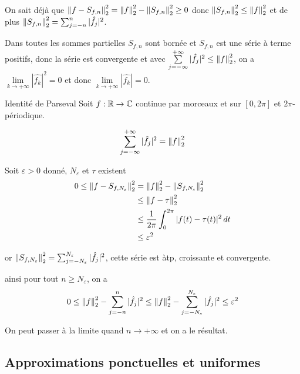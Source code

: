 \documentclass[a4paper, 12pt]{article}
\begin{document}
\begin{demonstration}

    On sait déjà que $\left\lVert f - S_{f,n}\right\rVert_2^2 = \left\lVert f\right\rVert_2^2 - \left\lVert S_{f,n}\right\rVert_2^2 \geq 0$
    donc $\left\lVert S_{f,n}\right\rVert_2^2 \leq \left\lVert f\right\rVert_2^2$ et de plus $\left\lVert S_{f,n}\right\rVert_2^2 = \sum_{j=-n}^n |\hat{f_j}|^2$.

    Dans toutes les sommes partielles $S_{f,n}$ sont bornée et $S_{f,n}$ est une série à terme positifs,
    donc la série est convergente et avec $\sum\limits_{j=-\infty}^{+\infty} |\hat{f_j}|^2 \leq \left\lVert f\right\rVert_2^2$, on a $\lim\limits_{k \to +\infty} |\hat{f_k}|^2 = 0$ et donc $\lim\limits_{k \to +\infty} |\hat{f_k}| = 0$.
\end{demonstration}

\begin{corollaire}{Identité de Parseval}{}
    Soit $f: \mathbb{R} \to \mathbb{C}$ continue par morceaux et sur $[0, 2\pi]$ et $2\pi$-périodique.

    $$
    \sum_{j=-\infty}^{+\infty} |\hat{f_j}|^2 = \left\lVert f\right\rVert_2^2
    $$
\end{corollaire}

\begin{demonstration}
    Soit $\varepsilon > 0$ donné, $N_\varepsilon$ et $\tau$ existent
    \begin{align*}
        0 \leq \left\lVert f - S_{f,N_\varepsilon}\right\rVert_2^2 &= \left\lVert f\right\rVert_2^2 - \left\lVert S_{f,N_\varepsilon}\right\rVert_2^2 \\
        &\leq \left\lVert f - \tau\right\rVert_2^2 \\
        & \leq \frac{1}{2\pi} \int_0^{2\pi} |f(t) - \tau(t)|^2 \, dt \\
        &\leq \varepsilon^2
    \end{align*}

    or $\left\lVert S_{f,N_\varepsilon}\right\rVert_2^2 = \sum_{j=-N_\varepsilon}^{N_\varepsilon} |\hat{f_j}|^2$, cette série est àtp, croissante et convergente.

    ainsi pour tout $n \geq N_\varepsilon$, on a
    $$
    0 \leq \left\lVert f\right\rVert_2^2 - \sum_{j=-n}^n |\hat{f_j}|^2 \leq \left\lVert f\right\rVert_2^2 - \sum_{j=-N_\varepsilon}^{N_\varepsilon} |\hat{f_j}|^2 \leq \varepsilon^2
    $$

    On peut passer à la limite quand $n \to +\infty$ et on a le résultat.
\end{demonstration}

\subsection{Approximations ponctuelles et uniformes}
\end{document}
